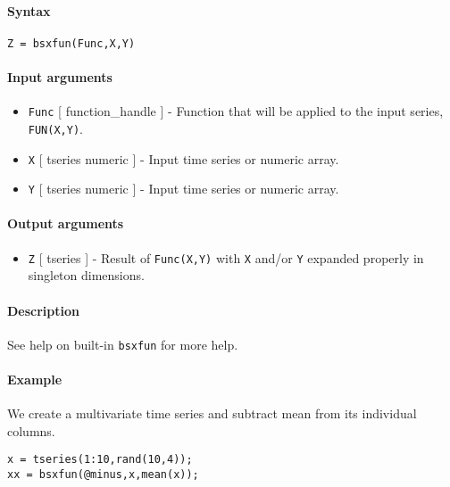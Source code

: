 


	\paragraph{Syntax}

\begin{verbatim}
Z = bsxfun(Func,X,Y)
\end{verbatim}

\paragraph{Input arguments}

\begin{itemize}
\item
  \texttt{Func} {[} function\_handle {]} - Function that will be applied
  to the input series, \texttt{FUN(X,Y)}.
\item
  \texttt{X} {[} tseries \textbar{} numeric {]} - Input time series or
  numeric array.
\item
  \texttt{Y} {[} tseries \textbar{} numeric {]} - Input time series or
  numeric array.
\end{itemize}

\paragraph{Output arguments}

\begin{itemize}
\itemsep1pt\parskip0pt
\item
  \texttt{Z} {[} tseries {]} - Result of \texttt{Func(X,Y)} with
  \texttt{X} and/or \texttt{Y} expanded properly in singleton
  dimensions.
\end{itemize}

\paragraph{Description}

See help on built-in \texttt{bsxfun} for more help.

\paragraph{Example}

We create a multivariate time series and subtract mean from its
individual columns.

\begin{verbatim}
x = tseries(1:10,rand(10,4));
xx = bsxfun(@minus,x,mean(x));
\end{verbatim}


